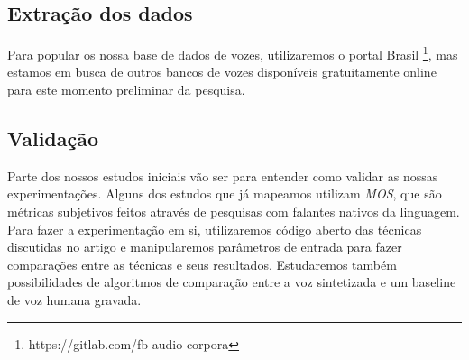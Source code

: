 \documentclass[a4paper,12pt]{article}
\begin{document}
		\subsection{Extração dos dados}
		Para popular os nossa base de dados de vozes, utilizaremos o portal Brasil \footnote{https://gitlab.com/fb-audio-corpora}, mas estamos em busca de outros bancos de vozes disponíveis gratuitamente online para este momento preliminar da pesquisa.

		\subsection{Validação}
		Parte dos nossos estudos iniciais vão ser para entender como validar as nossas experimentações. Alguns dos estudos que já mapeamos utilizam \textit{MOS}, que são métricas subjetivos feitos através de pesquisas com falantes nativos da linguagem. Para fazer a experimentação em si, utilizaremos código aberto das técnicas discutidas no artigo e manipularemos parâmetros de entrada para fazer comparações entre as técnicas e seus resultados. Estudaremos também possibilidades de algoritmos de comparação entre a voz sintetizada e um baseline de voz humana gravada.
	
	
	
\end{document}
